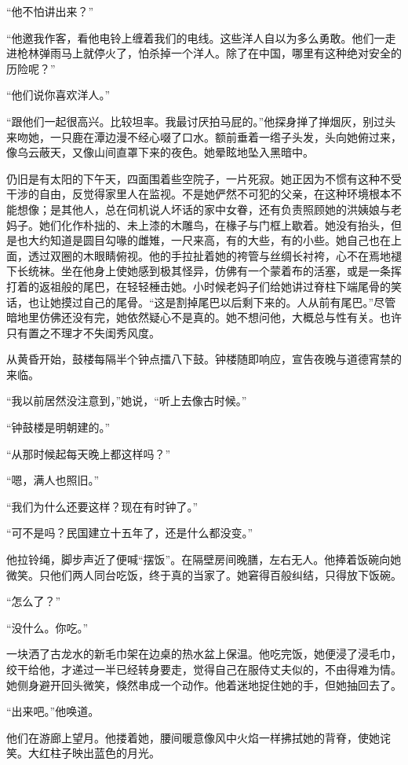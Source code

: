 \par “他不怕讲出来？”
\par “他邀我作客，看他电铃上缠着我们的电线。这些洋人自以为多么勇敢。他们一走进枪林弹雨马上就停火了，怕杀掉一个洋人。除了在中国，哪里有这种绝对安全的历险呢？”
\par “他们说你喜欢洋人。”
\par “跟他们一起很高兴。比较坦率。我最讨厌拍马屁的。”他探身掸了掸烟灰，别过头来吻她，一只鹿在潭边漫不经心啜了口水。额前垂着一绺子头发，头向她俯过来，像乌云蔽天，又像山间直罩下来的夜色。她晕眩地坠入黑暗中。
\par 仍旧是有太阳的下午天，四面围着些空院子，一片死寂。她正因为不惯有这种不受干涉的自由，反觉得家里人在监视。不是她俨然不可犯的父亲，在这种环境根本不能想像；是其他人，总在伺机说人坏话的家中女眷，还有负责照顾她的洪姨娘与老妈子。她们化作朴拙的、未上漆的木雕鸟，在椽子与门框上歇着。她没有抬头，但是也大约知道是圆目勾喙的雌雉，一尺来高，有的大些，有的小些。她自己也在上面，透过双圈的木眼睛俯视。他的手拉扯着她的袴管与丝绸长衬袴，心不在焉地褪下长统袜。坐在他身上使她感到极其怪异，仿佛有一个蒙着布的活塞，或是一条挥打着的返祖般的尾巴，在轻轻棰击她。小时候老妈子们给她讲过脊柱下端尾骨的笑话，也让她摸过自己的尾骨。“这是割掉尾巴以后剩下来的。人从前有尾巴。”尽管暗地里仿佛还没有完，她依然疑心不是真的。她不想问他，大概总与性有关。也许只有置之不理才不失闺秀风度。
\par 从黄昏开始，鼓楼每隔半个钟点擂八下鼓。钟楼随即响应，宣告夜晚与道德宵禁的来临。
\par “我以前居然没注意到，”她说，“听上去像古时候。”
\par “钟鼓楼是明朝建的。”
\par “从那时候起每天晚上都这样吗？”
\par “嗯，满人也照旧。”
\par “我们为什么还要这样？现在有时钟了。”
\par “可不是吗？民国建立十五年了，还是什么都没变。”
\par 他拉铃绳，脚步声近了便喊“摆饭”。在隔壁房间晚膳，左右无人。他捧着饭碗向她微笑。只他们两人同台吃饭，终于真的当家了。她窘得百般纠结，只得放下饭碗。
\par “怎么了？”
\par “没什么。你吃。”
\par 一块洒了古龙水的新毛巾架在边桌的热水盆上保温。他吃完饭，她便浸了浸毛巾，绞干给他，才递过一半已经转身要走，觉得自己在服侍丈夫似的，不由得难为情。她侧身避开回头微笑，倏然串成一个动作。他着迷地捉住她的手，但她抽回去了。
\par “出来吧。”他唤道。
\par 他们在游廊上望月。他搂着她，腰间暖意像风中火焰一样拂拭她的背脊，使她诧笑。大红柱子映出蓝色的月光。
